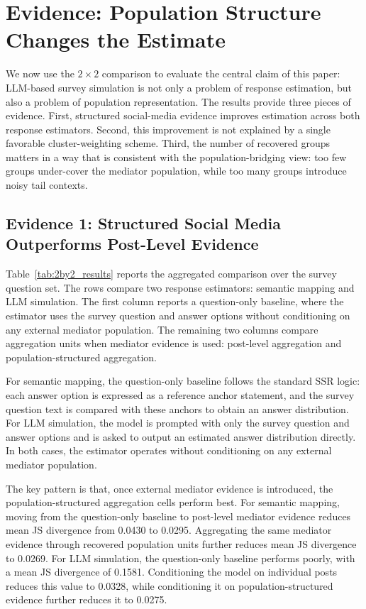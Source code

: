 \documentclass{article}
\begin{document}
\section{Evidence: Population Structure Changes the Estimate}
\label{sec:results}

We now use the $2\times2$ comparison to evaluate the central claim of this paper:
LLM-based survey simulation is not only a problem of response estimation, but also a
problem of population representation.
The results provide three pieces of evidence.
First, structured social-media evidence improves estimation across both response
estimators.
Second, this improvement is not explained by a single favorable cluster-weighting scheme.
Third, the number of recovered groups matters in a way that is consistent with the
population-bridging view: too few groups under-cover the mediator population, while too
many groups introduce noisy tail contexts.

\subsection{Evidence 1: Structured Social Media Outperforms Post-Level Evidence}

Table~\ref{tab:2by2_results} reports the aggregated comparison over the survey question
set. The rows compare two response estimators: semantic mapping and LLM simulation.
The first column reports a question-only baseline, where the estimator uses the survey
question and answer options without conditioning on any external mediator population.
The remaining two columns compare aggregation units when mediator evidence is used:
post-level aggregation and population-structured aggregation.

For semantic mapping, the question-only baseline follows the standard SSR logic: each
answer option is expressed as a reference anchor statement, and the survey question text
is compared with these anchors to obtain an answer distribution. For LLM simulation, the
model is prompted with only the survey question and answer options and is asked to output
an estimated answer distribution directly. In both cases, the estimator operates without
conditioning on any external mediator population.

The key pattern is that, once external mediator evidence is introduced, the
population-structured aggregation cells perform best. For semantic mapping, moving from
the question-only baseline to post-level mediator evidence reduces mean JS divergence
from 0.0430 to 0.0295. Aggregating the same mediator evidence through recovered
population units further reduces mean JS divergence to 0.0269. For LLM simulation, the
question-only baseline performs poorly, with a mean JS divergence of 0.1581. Conditioning
the model on individual posts reduces this value to 0.0328, while conditioning it on
population-structured evidence further reduces it to 0.0275.
\end{document}
